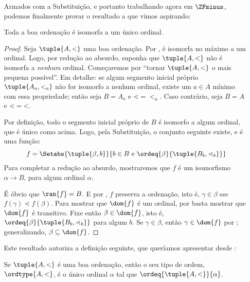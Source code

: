 \documentclass[../../../include/open-logic-section]{subfiles}
\begin{document}

Armados com a Substituição, e portanto trabalhando agora em $\ZFminus$,
podemos finalmente provar o resultado a que vimos aspirando:

\begin{thm}
Toda a boa ordenação é isomorfa a um único ordinal.
\end{thm}

\begin{proof}
Seja $\tuple{A, <}$ uma boa ordenação. Por
, é isomorfa no máximo a um
ordinal. Logo, por redução ao absurdo, suponha que $\tuple{A, <}$ não é
isomorfa a \emph{nenhum} ordinal. Começaremos por ``tornar $\tuple{A, <}$ o mais pequena possível''. Em detalhe: se algum segmento inicial próprio $\tuple{A_a,
<_a}$ não for isomorfo a nenhum ordinal, existe um $a \in A$ mínimo com
essa propriedade; então seja $B = A_a$ e $\mathord{\lessdot} =
\mathord{<_a}$. Caso contrário, seja $B = A$ e $\mathord{\lessdot} =
\mathord{<}$.

Por definição, todo o segmento inicial próprio de $B$ é isomorfo a
algum ordinal, que é único como acima. Logo,
pela Substituição, o conjunto seguinte existe, e é uma função:
\[
	f = \Setabs{\tuple{\beta, b}}{b \in B\text{ e }\ordeq{\beta}{\tuple{B_b, \lessdot_b}}}
\]
Para completar a redução ao absurdo, mostraremos que $f$ é um isomorfismo
$\alpha \to B$, para algum ordinal $\alpha$.

É óbvio que $\ran{f}
= B$. E por , $f$ preserva a ordenação,
isto é, $\gamma \in \beta$ sse $f(\gamma) \lessdot f(\beta)$. Para mostrar que $\dom{f}$ é um ordinal, por
 basta mostrar que
$\dom{f}$ é transitivo. Fixe então $\beta \in \dom{f}$, isto é,
$\ordeq{\beta}{\tuple{B_b, \lessdot_b}}$ para algum $b$. Se $\gamma \in
\beta$, então $\gamma \in \dom{f}$ por
; generalizando, $\beta \subseteq
\dom{f}$.
\end{proof}

Este resultado autoriza a definição seguinte, que queríamos apresentar
desde :

\begin{defn}
Se $\tuple{A, <}$ é uma boa ordenação, então o seu tipo de ordem,
$\ordtype{A, <}$, é o único ordinal $\alpha$ tal que
$\ordeq{\tuple{A, < }}{\alpha}$.
\end{defn}
\end{document}
